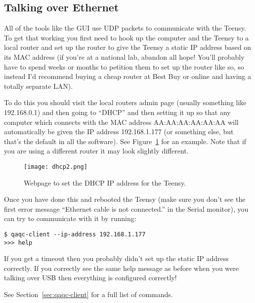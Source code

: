 \documentclass[12pt,openright,twoside]{report}
\begin{document}
\subsection{Talking over Ethernet}

All of the tools like the GUI use UDP packets to communicate with the Teensy.
To get that working you first need to hook up the computer and the Teensy to a
local router and set up the router to give the Teensy a static IP address based
on its MAC address (if you're at a national lab, abandon all hope! You'll
probably have to spend weeks or months to petition them to set up the router
like so, so instead I'd recommend buying a cheap router at Best Buy or online
and having a totally separate LAN).

To do this you should visit the local routers admin page (usually something
like 192.168.0.1) and then going to ``DHCP'' and then
setting it up so that any computer which connects with the MAC address
AA:AA:AA:AA:AA:AA will automatically be given the IP address 192.168.1.177 (or
something else, but that's the default in all the software). See
Figure~\ref{fig:dhcp} for an example. Note that if you are using a different
router it may look slightly different.

\begin{figure}
\centering
\texttt{[image: dhcp2.png]}
\caption{Webpage to set the DHCP IP address for the Teensy.}
\label{fig:dhcp}
\end{figure}

Once you have done this and rebooted the Teensy (make sure you don't see the first error message ``Ethernet cable is not connected.'' in the Serial monitor), you can try to communicate with it by running:

\begin{mdframed}[backgroundcolor=light-gray, roundcorner=10pt,leftmargin=1, rightmargin=1, innerleftmargin=15, innertopmargin=15,innerbottommargin=15, outerlinewidth=1, linecolor=light-gray]
\begin{lstlisting}
$ qaqc-client --ip-address 192.168.1.177
>>> help
\end{lstlisting}
\end{mdframed}

If you get a timeout then you probably didn't set up the static IP address
correctly. If you correctly see the same help message as before when you were
talking over USB then everything is configured correctly!

See Section~\ref{sec:qaqc-client} for a full list of commands.
\end{document}
